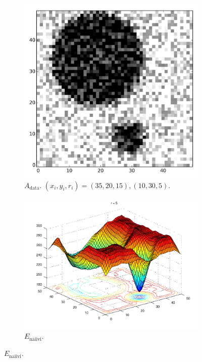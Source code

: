 \begin{figure}[p]
    \centering
    \begin{subfigure}[b]{0.3\textwidth}
        \includegraphics[width=\textwidth]{figures/localmindata.png}
        \caption{$A_\text{data}$. $(x_i,y_i,r_i) = (35, 20, 15), (10, 30, 5)$.
            \label{fig:localmin_data}
        }
    \end{subfigure}

    \begin{subfigure}[b]{0.7\textwidth}
            \includegraphics[width=\textwidth]{figures/localmins2.pdf}
        \caption{
            $E_\text{naiivi}$.
            \label{fig:localmins2}
        }
    \end{subfigure}


\end{figure}
